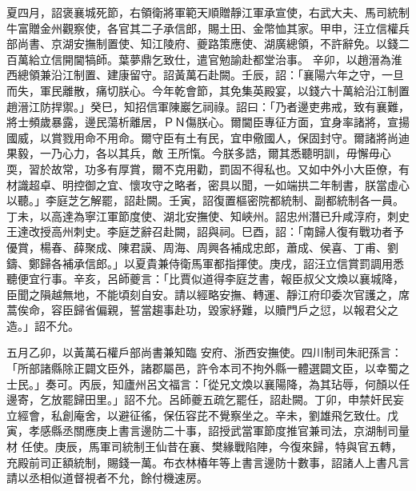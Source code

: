 \begin{pinyinscope}
 夏四月，詔褒襄城死節，右領衛將軍範天順贈靜江軍承宣使，右武大夫、馬司統制牛富贈金州觀察使，各官其二子承信郎，賜土田、金幣恤其家。甲申，汪立信權兵部尚書、京湖安撫制置使、知江陵府、夔路策應使、湖廣總領，不許辭免。以錢二百萬給立信開閫犒師。葉夢鼎乞致仕，遣官勉諭赴都堂治事。
 辛卯，以趙溍為淮西總領兼沿江制置、建康留守。詔黃萬石赴闕。壬辰，詔：「襄陽六年之守，一旦而失，軍民離散，痛切朕心。今年乾會節，其免集英殿宴，以錢六十萬給沿江制置趙溍江防捍禦。」癸巳，知招信軍陳巖乞祠祿。詔曰：「乃者邊吏弗戒，致有襄難，將士頻歲暴露，邊民蕩析離居，ＰＮ傷朕心。爾閫臣專征方面，宜身率諸將，宣揚國威，以賞戮用命不用命。爾守臣有土有民，宜申儆國人，保固封守。爾諸將尚迪果毅，一乃心力，各以其兵，敵
 王所愾。今朕多誥，爾其悉聽明訓，毋懈毋心耎，習於故常，功多有厚賞，爾不克用勸，罰固不得私也。又如中外小大臣僚，有材識超卓、明控御之宜、懷攻守之略者，密具以聞，一如端拱二年制書，朕當虛心以聽。」李庭芝乞解罷，詔赴闕。壬寅，詔復置樞密院都統制、副都統制各一員。丁未，以高達為寧江軍節度使、湖北安撫使、知峽州。詔忠州潛已升咸淳府，刺史王達改授高州刺史。李庭芝辭召赴闕，詔與祠。巳酉，詔：「南歸人復有戰功者予
 優賞，楊春、薛聚成、陳君謨、周海、周興各補成忠郎，蕭成、侯喜、丁甫、劉鑄、鄭歸各補承信郎。」以夏貴兼侍衛馬軍都指揮使。庚戌，詔汪立信賞罰調用悉聽便宜行事。辛亥，呂師夔言：「比賈似道得李庭芝書，報臣叔父文煥以襄城降，臣聞之隕越無地，不能頃刻自安。請以經略安撫、轉運、靜江府印委次官護之，席蒿俟命，容臣歸省偏親，誓當趨事赴功，毀家紓難，以贖門戶之愆，以報君父之造。」詔不允。



 五月乙卯，以黃萬石權戶部尚書兼知臨
 安府、浙西安撫使。四川制司朱祀孫言：「所部諸縣除正闢文臣外，諸郡屬邑，許令本司不拘外縣一體選闢文臣，以幸蜀之士民。」奏可。丙辰，知廬州呂文福言：「從兄文煥以襄陽降，為其玷辱，何顏以任邊寄，乞放罷歸田里。」詔不允。呂師夔五疏乞罷任，詔赴闕。丁卯，申禁奸民妄立經會，私創庵舍，以避征徭，保伍容芘不覺察坐之。辛未，劉雄飛乞致仕。戊寅，孝感縣丞關應庚上書言邊防二十事，詔授武當軍節度推官兼司法，京湖制司量材
 任使。庚辰，馬軍司統制王仙昔在襄、樊緣戰陷陣，今復來歸，特與官五轉，充殿前司正額統制，賜錢一萬。布衣林椿年等上書言邊防十數事，詔諸人上書凡言請以丞相似道督視者不允，餘付機速房。




\end{pinyinscope}
